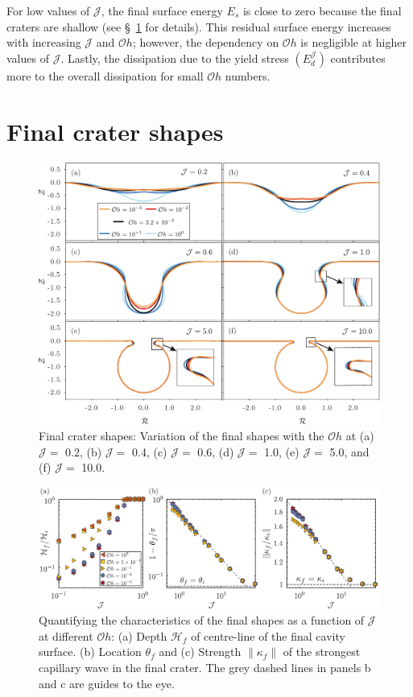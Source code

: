 \documentclass[final]{jfm}
\begin{document}
For low values of $\mathcal{J}$, the final surface energy $E_s$ is close to zero because the final craters are shallow (see \S~\ref{Sec::EquilibriumStates} for details). This residual surface energy increases with increasing $\mathcal{J}$ and $\mathcal{O}h$; however, the dependency on $\mathcal{O}h$ is negligible at higher values of $\mathcal{J}$. Lastly, the dissipation due to the yield stress $\left(E_d^\mathcal{J}\right)$ contributes more to the overall dissipation for small $\mathcal{O}h$ numbers.

\section{Final crater shapes}\label{Sec::EquilibriumStates}
 \begin{figure}
	\centerline{\includegraphics[width=\linewidth]{Figures/Figure6_FinalShapes-eps-converted-to.pdf}}%
	\caption{Final crater shapes: Variation of the final shapes with the $\mathcal{O}h$ at (a) $\mathcal{J} =$ 0.2, (b) $\mathcal{J} =$ 0.4, (c) $\mathcal{J} =$ 0.6, (d) $\mathcal{J} =$ 1.0, (e) $\mathcal{J} =$ 5.0, and (f) $\mathcal{J} =$ 10.0.}
	\label{fig:Zoo_of_Final_Shapes}
\end{figure}
\begin{figure}
	\centerline{\includegraphics[width=\linewidth]{Figures/Figure7_FrozenState_Quantify-eps-converted-to.pdf}}%
	\caption{Quantifying the characteristics of the final shapes as a function of $\mathcal{J}$ at different $\mathcal{O}h$: (a) Depth $\mathcal{H}_f$ of centre-line of the final cavity surface. (b) Location $\theta_f$ and (c) Strength $\|\kappa_f\|$ of the strongest capillary wave in the final crater. The grey dashed lines in panels b and c are guides to the eye.}
	\label{fig:Quantification_Final_Shapes}
\end{figure}
\end{document}
